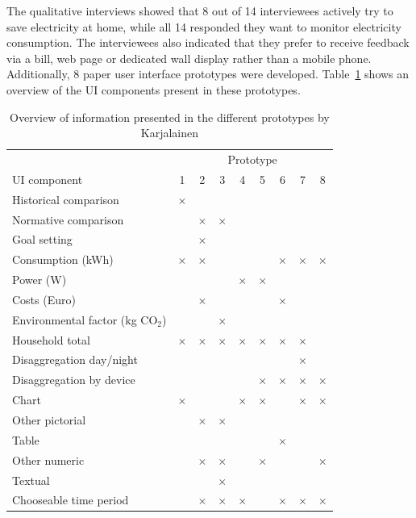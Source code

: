 \documentclass[journal]{vgtc}                %
\begin{document}
The qualitative interviews showed that 8 out of 14 interviewees actively try to save electricity at home, while all 14 responded they want to monitor electricity consumption. The interviewees also indicated that they prefer to receive feedback via a bill, web page or dedicated wall display rather than a mobile phone. \\

Additionally, 8 paper user interface prototypes were developed. Table~\ref{prototypes} shows an overview of the UI components present in these prototypes.

\begin{table}
  \caption{Overview of information presented in the different prototypes by Karjalainen\cite{karjalainen2011consumer}}
  \label{prototypes}
  \scriptsize
  \begin{center}
    \begin{tabular}{|l|cccccccc|}
    \hline
      & \multicolumn{8}{|c|}{Prototype} \\
    
      UI component & 1 & 2 & 3 & 4 & 5 & 6 & 7 & 8 \\
    \hline
      Historical comparison & $\times$ &  &  &  &  &  &  & \\ \hline
      Normative comparison &  & $\times$ & $\times$ &  &  &  &  & \\ \hline
      Goal setting &  & $\times$ &  &  &  &  &  & \\ \hline
      Consumption (kWh) & $\times$ & $\times$ &  &  &  & $\times$ & $\times$ & $\times$ \\ \hline
      Power (W) &  &  &  & $\times$ & $\times$ &  &  & \\ \hline
      Costs (Euro) &  & $\times$ &  &  &  & $\times$ &  & \\ \hline
      Environmental factor (kg CO$_2$) &  &  & $\times$ &  &  &  &  & \\ \hline
      Household total & $\times$ & $\times$ & $\times$ & $\times$ & $\times$ & $\times$ & $\times$ & \\ \hline
      Disaggregation day/night &  &  &  &  &  &  & $\times$ & \\ \hline
      Disaggregation by device &  &  &  &  & $\times$ & $\times$ & $\times$ & $\times$ \\ \hline
      Chart & $\times$ &  &  & $\times$ & $\times$ &  & $\times$ & $\times$ \\ \hline
      Other pictorial &  & $\times$ & $\times$ &  &  &  &  & \\ \hline
      Table &  &  &  &  &  & $\times$ &  & \\ \hline
      Other numeric &  & $\times$ & $\times$ &  & $\times$ &  &  & $\times$ \\ \hline
      Textual &  &  & $\times$ &  &  &  &  & \\ \hline
      Chooseable time period &  & $\times$ & $\times$ & $\times$ &  & $\times$ & $\times$ &  $\times$ \\ \hline
    \end{tabular}
  \end{center}
\end{table}
\end{document}
